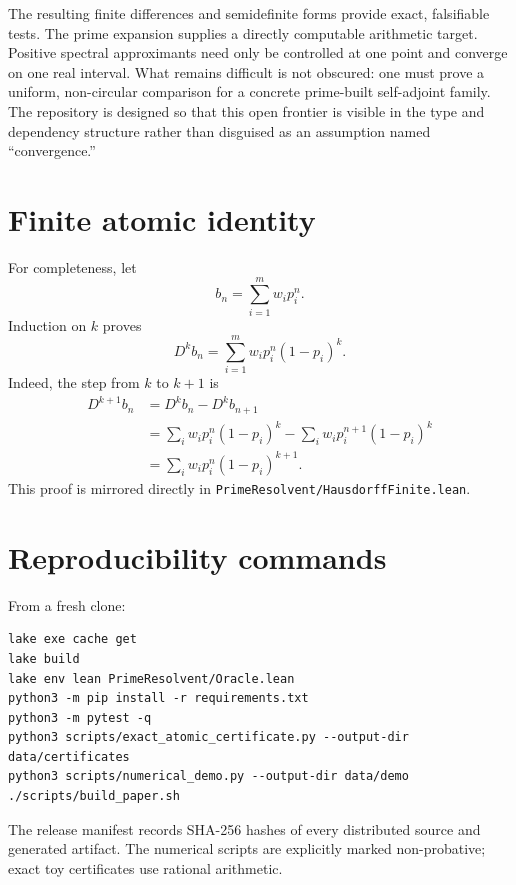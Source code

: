 \documentclass[11pt]{article}
\theoremstyle{definition}
\begin{document}
The resulting finite differences and semidefinite forms provide exact, falsifiable tests. The
prime expansion supplies a directly computable arithmetic target. Positive spectral approximants
need only be controlled at one point and converge on one real interval. What remains difficult is
not obscured: one must prove a uniform, non-circular comparison for a concrete prime-built
self-adjoint family. The repository is designed so that this open frontier is visible in the type and
dependency structure rather than disguised as an assumption named ``convergence.''

\appendix
\section{Finite atomic identity}

For completeness, let
\[
 b_n=\sum_{i=1}^mw_ip_i^n.
\]
Induction on $k$ proves
\[
 D^kb_n=\sum_{i=1}^mw_ip_i^n(1-p_i)^k.
\]
Indeed, the step from $k$ to $k+1$ is
\begin{align*}
 D^{k+1}b_n
 &=D^kb_n-D^kb_{n+1}\\
 &=\sum_iw_ip_i^n(1-p_i)^k
   -\sum_iw_ip_i^{n+1}(1-p_i)^k\\
 &=\sum_iw_ip_i^n(1-p_i)^{k+1}.
\end{align*}
This proof is mirrored directly in \texttt{PrimeResolvent/HausdorffFinite.lean}.

\section{Reproducibility commands}

From a fresh clone:
\begin{lstlisting}[style=lean,language={}]
lake exe cache get
lake build
lake env lean PrimeResolvent/Oracle.lean
python3 -m pip install -r requirements.txt
python3 -m pytest -q
python3 scripts/exact_atomic_certificate.py --output-dir data/certificates
python3 scripts/numerical_demo.py --output-dir data/demo
./scripts/build_paper.sh
\end{lstlisting}
The release manifest records SHA-256 hashes of every distributed source and generated artifact.
The numerical scripts are explicitly marked non-probative; exact toy certificates use rational
arithmetic.
\end{document}
